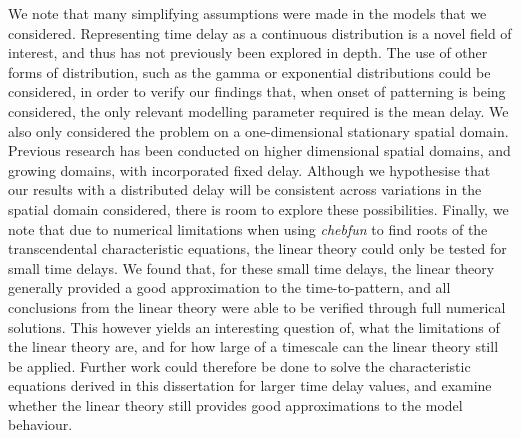 We note that many simplifying assumptions were made in the models that we considered. Representing time delay as a continuous distribution is a novel field of interest, and thus has not previously been explored in depth. The use of other forms of distribution, such as the gamma or exponential distributions could be considered, in order to verify our findings that, when onset of patterning is being considered, the only relevant modelling parameter required is the mean delay. We also only considered the problem on a one-dimensional stationary spatial domain. Previous research has been conducted on higher dimensional spatial domains, and growing domains, with incorporated fixed delay. Although we hypothesise that our results with a distributed delay will be consistent across variations in the spatial domain considered, there is room to explore these possibilities. Finally, we note that due to numerical limitations when using \textit{chebfun} to find roots of the transcendental characteristic equations, the linear theory could only be tested for small time delays. We found that, for these small time delays, the linear theory generally provided a good approximation to the time-to-pattern, and all conclusions from the linear theory were able to be verified through full numerical solutions. This however yields an interesting question of, what the limitations of the linear theory are, and for how large of a timescale can the linear theory still be applied. Further work could therefore be done to solve the characteristic equations derived in this dissertation for larger time delay values, and examine whether the linear theory still provides good approximations to the model behaviour.
